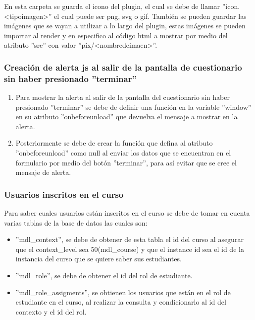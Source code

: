 			En esta carpeta se guarda el icono del plugin, el cual se debe de llamar ''icon.<tipoimagen>'' el cual puede ser png, svg o gif.
			También se pueden guardar las imágenes que se vayan a utilizar a lo largo del plugin, estas imágenes se pueden importar al render y en especifico al código html a mostrar por medio del atributo ''src'' con valor ''pix/<nombredeimaen>''.

	\subsubsection{Creación de alerta js al salir de la pantalla de cuestionario sin haber presionado ''terminar''}

    \begin{enumerate}
      \item Para mostrar la alerta al salir de la pantalla del cuestionario sin haber presionado ''terminar'' se debe de definir una función en la variable ''window'' en su atributo ''onbeforeunload'' que devuelva el mensaje a mostrar en la alerta.
      \item Posteriormente se debe de crear la función que defina al atributo ''onbeforeunload'' como null al enviar los datos que se encuentran en el formulario por medio del botón ''terminar'', para así evitar que se cree el mensaje de alerta.
    \end{enumerate}


  \subsubsection{Usuarios inscritos en el curso}
		Para saber cuales usuarios están inscritos en el curso se debe de tomar en cuenta varias tablas de la base de datos las cuales son:
    \begin{itemize}
      \item ''mdl\_context'', se debe de obtener de esta tabla el id del curso al asegurar que el context\_level sea 50(mdl\_course) y que el instance id sea el id de la instancia del curso que se quiere saber sus estudiantes.
      \item ''mdl\_role'', se debe de obtener el id del rol de estudiante.
      \item ''mdl\_role\_assigments'', se obtienen los usuarios que están en el rol de estudiante en el curso, al realizar la consulta y condicionarlo al id del contexto y el id del rol.
    \end{itemize}

    \clearpage

